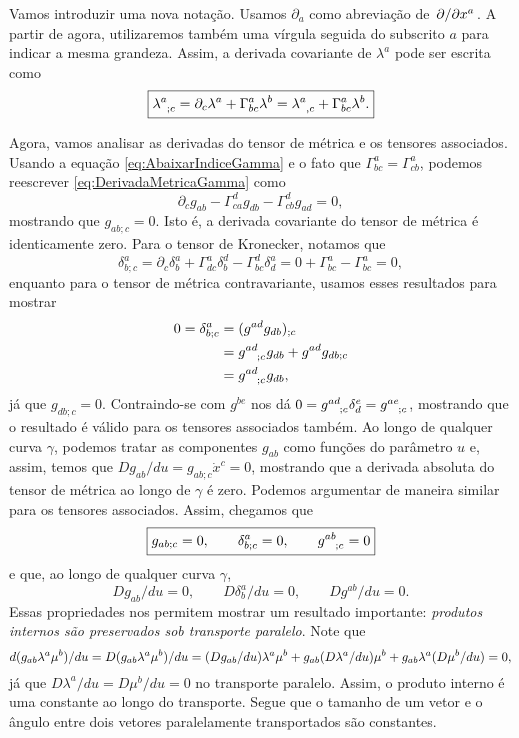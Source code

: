 Vamos introduzir uma nova notação. Usamos $\partial _a$ como abreviação de $\pdv*{x^a}$. A partir de agora, utilizaremos também uma vírgula seguida do subscrito $a$ para indicar a mesma grandeza. Assim, a derivada covariante de $\lambda^a$ pode ser escrita como
\begin{equation}
	\boxed{
		\tensor{\lambda}{^a_{;c}}=\partial_c\lambda^a+\Gamma^a_{bc}\lambda^b = 
		\tensor{\lambda}{^a_{,c}}+\Gamma^a_{bc}\lambda^b .
	}
\end{equation}

Agora, vamos analisar as derivadas do tensor de métrica e os tensores associados. Usando a equação \eqref{eq:AbaixarIndiceGamma} e o fato que $\Gamma^a_{bc}=\Gamma^a_{cb}$, podemos reescrever \eqref{eq:DerivadaMetricaGamma} como
\[
	\partial_c g_{ab}-\Gamma^d_{ca}g_{db}-\Gamma^d_{cb}g_{ad}=0,
\]
mostrando que $g_{ab;c}=0$. Isto é, a derivada covariante do tensor de métrica é identicamente zero. Para o tensor de Kronecker, notamos que
\[
	\delta^a_{b;c}=\partial_c\delta^a_b+\Gamma^a_{dc}\delta^d_b-\Gamma^d_{bc}\delta^a_d=0+\Gamma^a_{bc}-\Gamma ^a_{bc}=0,
\]
enquanto para o tensor de métrica contravariante, usamos esses resultados para mostrar
\begin{align*}
	0 = \delta^a_{b;c} &= (g^{ad}g_{db})_{;c} \\
	&= \tensor{g}{^a^d_{;c}}g_{db}+g^{ad}g_{db;c} \\
	&= \tensor{g}{^a^d_{;c}}g_{db} ,
\end{align*}
já que $g_{db;c}=0$. Contraindo-se com $g^{be}$ nos dá $0=\tensor{g}{^a^d_{;c}}\delta^e_d=\tensor{g}{^a^e_{;c}}$, mostrando que o resultado é válido para os tensores associados também. Ao longo de qualquer curva $\gamma$, podemos tratar as componentes $g_{ab}$ como funções do parâmetro $u$ e, assim, temos que $Dg_{ab}/du=g_{ab;c}\dot{x}^c=0$, mostrando que a derivada absoluta do tensor de métrica ao longo de $\gamma$ é zero. Podemos argumentar de maneira similar para os tensores associados. Assim, chegamos que
\begin{equation}\label{eq:DerivadaCovarianteMetrica}
	\boxed{
	g_{ab;c}=0, \qquad \delta^a_{b;c}=0, \qquad \tensor{g}{^a^b_{;c}}=0
	}
\end{equation}
e que, ao longo de qualquer curva $\gamma$,
\begin{equation}
	\boxed{
	Dg_{ab}/du=0, \qquad D\delta^a_b/du=0, \qquad Dg^{ab}/du=0.
	}
\end{equation}
Essas propriedades nos permitem mostrar um resultado importante: \textit{produtos internos são preservados sob transporte paralelo}. Note que
\[
d(g_{ab}\lambda^a\mu^b)/du = D(g_{ab}\lambda^a\mu^b)/du	\\
= (Dg_{ab}/du)\lambda^a\mu^b + g_{ab}(D\lambda^a/du)\mu^b+g_{ab}\lambda^a(D\mu^b/du)=0,
\]
já que $D\lambda^a/du=D\mu^b/du=0$ no transporte paralelo. Assim, o produto interno é uma constante ao longo do transporte. Segue que o tamanho de um vetor  e o ângulo entre dois vetores paralelamente transportados são constantes.

